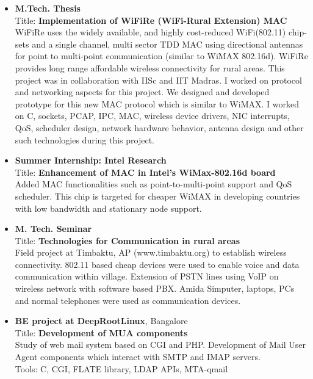 \documentclass{res}
\begin{document}
\begin{resume}
\begin{itemize}
					  \item {\bf M.Tech. Thesis} \\
					  Title: {\bf Implementation of WiFiRe (WiFi-Rural Extension) MAC}\\
					  WiFiRe uses the widely available, and highly cost-reduced WiFi(802.11) chip-sets and a single channel, multi sector TDD MAC using directional antennas for point to multi-point communication (similar to WiMAX 802.16d). WiFiRe provides long range affordable wireless connectivity for rural areas. This project was in collaboration with IISc and IIT Madras. I worked on protocol and networking aspects for this project. We designed and developed prototype for this new MAC protocol which is similar to WiMAX. I worked on C, sockets, PCAP, IPC, MAC, wireless device drivers, NIC interrupts, QoS, scheduler design, network hardware behavior, antenna design and other such technologies during this project.


					  \item {\bf Summer Internship: Intel Research}\\
					  Title: {\bf Enhancement of MAC in Intel’s WiMax-802.16d board}\\
					  Added MAC functionalities such as point-to-multi-point support and QoS scheduler. This chip is targeted for cheaper WiMAX in developing countries with low bandwidth and stationary node support.

                     \item {\bf M. Tech. Seminar} \\
					 Title: {\bf Technologies for Communication in rural areas}\\
	Field project at Timbaktu, AP (www.timbaktu.org) to establish wireless connectivity. 802.11 based cheap devices were used to enable voice and data communication within village. Extension of PSTN lines using VoIP on wireless network with software based PBX. Amida Simputer, laptops, PCs and normal telephones were used as communication devices.

	                \item {\bf BE project at DeepRootLinux}, Bangalore\\
				Title: {\bf Development of MUA components} \\
				Study of web mail system based on CGI and PHP. Development of Mail User Agent components which interact with SMTP and IMAP servers.\\
				Tools: C, CGI, FLATE library, LDAP APIs, MTA-qmail


\end{itemize}
\end{resume}
\end{document}
